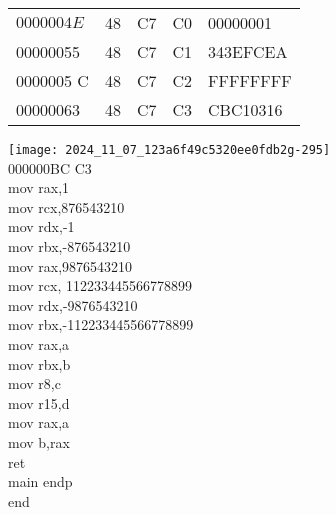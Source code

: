 \documentclass[10pt]{article}
\begin{document}
\begin{center}
\begin{tabular}{lllll}
$0000004 E$ & 48 & C7 & C0 & 00000001 \\
00000055 & 48 & C7 & C1 & 343EFCEA \\
0000005 C & 48 & C7 & C2 & FFFFFFFF \\
00000063 & 48 & C7 & C3 & CBC10316 \\
\end{tabular}
\end{center}

\texttt{[image: 2024\_11\_07\_123a6f49c5320ee0fdb2g-295]}\\
000000BC C3\\
mov rax,1\\
mov rcx,876543210\\
mov rdx,-1\\
mov rbx,-876543210\\
mov rax,9876543210\\
mov rcx, 112233445566778899\\
mov rdx,-9876543210\\
mov rbx,-112233445566778899\\
mov rax,a\\
mov rbx,b\\
mov r8,c\\
mov r15,d\\
mov rax,a\\
mov b,rax\\
ret\\
main endp\\
end
\end{document}
